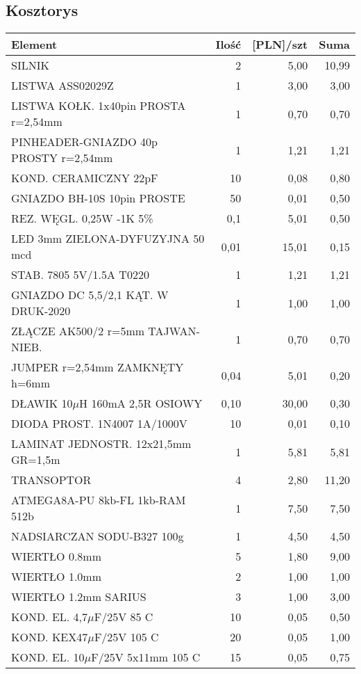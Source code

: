 \documentclass[11pt,a4paper]{article}
\begin{document}
\subsection{Kosztorys}
\begin{longtable}{|l|r|r|r|}
  \hline
  Element & Ilość & [PLN]/szt & Suma \\
  \hline \hline
  SILNIK & 2 & 5,00 & 10,99\\
  LISTWA ASS02029Z & 1 & 3,00 & 3,00 \\
  LISTWA KOŁK. 1x40pin PROSTA r=2,54mm & 1 & 0,70 & 0,70 \\
  PINHEADER-GNIAZDO 40p PROSTY r=2,54mm & 1 & 1,21 & 1,21 \\
  KOND. CERAMICZNY 22pF & 10 & 0,08 & 0,80 \\
  GNIAZDO BH-10S 10pin PROSTE & 50 & 0,01 & 0,50 \\
  REZ. WĘGL. 0,25W -1K 5\% & 0,1 & 5,01 & 0,50 \\
  LED 3mm ZIELONA-DYFUZYJNA 50 mcd & 0,01 & 15,01 & 0,15 \\
  STAB. 7805 5V/1.5A T0220 & 1 & 1,21 & 1,21 \\
  GNIAZDO DC 5,5/2,1 KĄT. W DRUK-2020 & 1 & 1,00 & 1,00 \\
  ZŁĄCZE AK500/2 r=5mm TAJWAN-NIEB. & 1 & 0,70 & 0,70 \\
  JUMPER r=2,54mm ZAMKNĘTY h=6mm & 0,04 & 5,01 & 0,20 \\
  DŁAWIK 10$\mu$H 160mA 2,5R OSIOWY & 0,10 & 30,00 & 0,30 \\
  DIODA PROST. 1N4007 1A/1000V & 10 & 0,01 & 0,10 \\
  LAMINAT JEDNOSTR. 12x21,5mm GR=1,5m & 1 & 5,81 & 5,81 \\
  TRANSOPTOR & 4 & 2,80 & 11,20 \\
  ATMEGA8A-PU 8kb-FL 1kb-RAM 512b & 1 & 7,50 & 7,50 \\
  NADSIARCZAN SODU-B327 100g & 1 & 4,50 & 4,50 \\
  WIERTŁO 0.8mm & 5 & 1,80 & 9,00 \\
  WIERTŁO 1.0mm & 2 & 1,00 & 1,00 \\
  WIERTŁO 1.2mm SARIUS & 3 & 1,00 & 3,00 \\
  KOND. EL. 4,7$\mu$F/25V 85 C & 10 & 0,05 & 0,50 \\ 
  KOND. KEX47$\mu$F/25V 105 C & 20 & 0,05 & 1,00 \\
  KOND. EL. 10$\mu$F/25V 5x11mm 105 C & 15 & 0,05 & 0,75 \\

\end{longtable}
\end{document}
